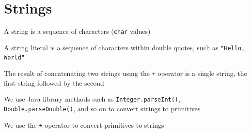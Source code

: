 \documentclass[8pt,a4paper,compress]{beamer}
\begin{document}
\section{Strings}
\begin{frame}[fragile]
\pause

A string is a sequence of characters (\lstinline{char} values) 

\pause
\bigskip

A string literal is a sequence of characters within double quotes, such as \lstinline{"Hello, World"}

\pause
\bigskip

The result of concatenating two strings using the \lstinline{+} operator is a single string, the first string followed by the second

\pause
\bigskip

We use Java library methods such as \lstinline{Integer.parseInt()}, \lstinline{Double.parseDouble()}, and so on to convert strings to primitives

\pause
\bigskip

We use the \lstinline{+} operator to convert primitives to strings
\end{frame}
\end{document}
